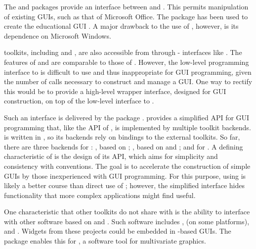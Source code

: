 \documentclass[article]{jss}
\begin{document}
The  \citep{RDCOM} and  \citep{RDCOM2} packages provide
an interface between  and  \citep{DCOM}. This permits
manipulation of existing GUIs, such as that of Microsoft Office. The 
package has been used to create the educational  GUI 
\citep{simpleR}. A major drawback to the use of , however, is
its dependence on Microsoft Windows.

 toolkits, including  and , are also accessible
from  through - interfaces like  
\citep{rJava}. The features
of  and  are comparable to those of .
However, the low-level programming interface to  
is difficult to use and thus inappropriate for GUI programming, given the
number of calls necessary to construct and manage a GUI. One way to rectify
this would be to provide a high-level wrapper interface, designed for GUI
construction, on top of the low-level interface to .

Such an interface is delivered by the  package
\citep{gwidgets}.  provides a simplified API for GUI programming
that, like the API of , is implemented by multiple toolkit 
backends.  is written in , so its backends rely on 
bindings to the external toolkits. So far, there are three backends for 
: , based on ; ,
based on  and ; and  for .
A defining characteristic of  is the
design of its API, which aims for simplicity and consistency with 
conventions.  The goal is to accelerate the construction of simple 
GUIs by those inexperienced with GUI programming. For this purpose, using 
 is likely a better course than direct use of ; however,
the simplified interface hides functionality that more complex applications
might find useful.

One characteristic that other toolkits do not share with  is the 
ability to interface with other software based on  and .
Such software includes ,  (on some platforms), 
and . Widgets from these projects could be embedded in 
-based GUIs. The 
package enables this for , a software tool for multivariate graphics. 
\end{document}
